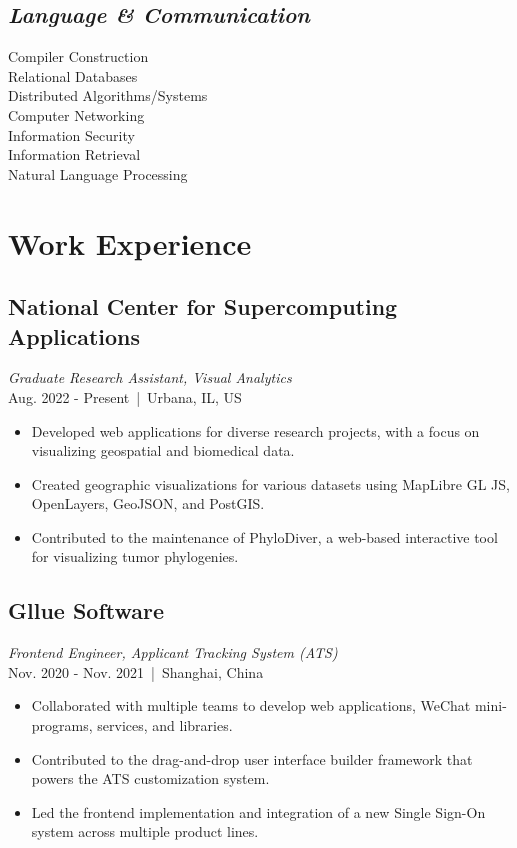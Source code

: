 \documentclass[11pt]{article}
\begin{document}
\begin{minipage}{250pt}
\subsection*{\it Language \& Communication}
Compiler Construction\\
Relational Databases\\
Distributed Algorithms/Systems\\
Computer Networking\\
Information Security\\
Information Retrieval\\
Natural Language Processing

\end{minipage}
\begin{minipage}{280pt}

\section*{\sc Work Experience}

\subsection*{National Center for Supercomputing Applications}
\textit{Graduate Research Assistant, Visual Analytics} \\
Aug. 2022 - Present \,|\, Urbana, IL, US\\
\begin{itemize}
\item Developed web applications for diverse research projects, with a focus on visualizing geospatial and biomedical data.
\item Created geographic visualizations for various datasets using MapLibre GL JS, OpenLayers, GeoJSON, and PostGIS.
\item Contributed to the maintenance of PhyloDiver, a web-based interactive tool for visualizing tumor phylogenies.
\end{itemize}

\subsection*{Gllue Software}
\textit{Frontend Engineer, Applicant Tracking System (ATS)}\\
Nov. 2020 - Nov. 2021 \,|\, Shanghai, China\\
\begin{itemize}
\item Collaborated with multiple teams to develop web applications, WeChat mini-programs, services, and libraries.
\item Contributed to the drag-and-drop user interface builder framework that powers the ATS customization system.
\item Led the frontend implementation and integration of a new Single Sign-On system across multiple product lines.
\end{itemize}


\end{minipage}
\end{document}
